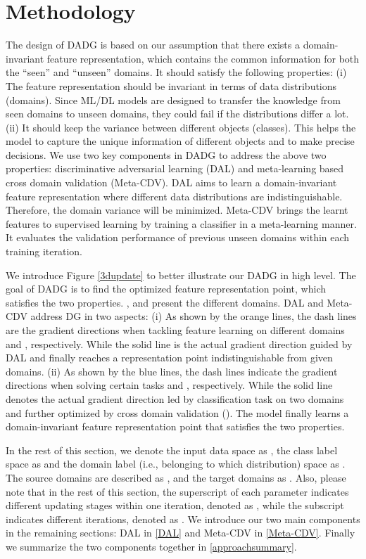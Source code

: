 \documentclass[twocolumn,preprint]{elsarticle}
\begin{document}
\section{Methodology} \label{section:method}
The design of DADG is based on our assumption that there exists a domain-invariant feature representation, which contains the common  information for both the ``seen'' and ``unseen'' domains. It should satisfy the following properties: 
(i) The feature representation should be invariant in terms of data distributions (domains). Since ML/DL models are designed to transfer the knowledge from seen domains to unseen domains, they could fail if the distributions differ a lot.
(ii) It should keep the variance between different objects (classes). This helps the model to capture the unique information of different objects and to make precise decisions. We use two key components in DADG to address the above two properties: discriminative adversarial learning (DAL) and meta-learning based cross domain validation (Meta-CDV).
DAL aims to learn a domain-invariant feature representation where different data distributions are indistinguishable. Therefore, the domain variance will be minimized. 
Meta-CDV brings the learnt features to supervised learning by training a classifier in a meta-learning manner. It evaluates the validation performance of previous unseen domains within each training iteration. 

We introduce Figure \ref{3dupdate} to better illustrate our DADG in high level. The goal of DADG is to find the optimized feature representation point, which satisfies the two properties. ,  and  present the different domains. DAL and Meta-CDV address DG in two aspects: 
(i) As shown by the orange lines, the dash lines are the gradient directions when tackling feature learning on different domains  and , respectively. While the solid line is the actual gradient direction guided by DAL and finally reaches a representation point indistinguishable from given domains.
(ii) As shown by the blue lines, the dash lines indicate the gradient directions when solving certain tasks  and , respectively. While the solid line denotes the actual gradient direction led by classification task on two domains and further optimized by cross domain validation (). 
The model finally learns a domain-invariant feature representation point that satisfies the two properties.

In the rest of this section, we denote the input data space as , the class label space as  and the domain label (i.e., belonging to which distribution) space as . The source domains are described as 
, and the target domains as . Also, please note that in the rest of this section, the superscript of each parameter indicates different updating stages within one iteration, denoted as , while the subscript indicates different iterations, denoted as . We introduce our two main components in the remaining sections:  DAL in \ref{DAL} and Meta-CDV in \ref{Meta-CDV}. Finally we summarize the two components together in \ref{approachsummary}. 
\end{document}
